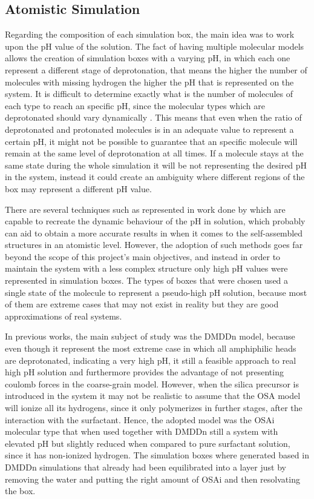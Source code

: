 \documentclass[10pt,a4paper,twoside]{article}
\begin{document}
\subsection{Atomistic Simulation}

Regarding the composition of each simulation box, the main idea was to work upon the pH value of the solution. The fact of having multiple molecular models allows the creation of simulation boxes with a varying pH, in which each one represent a different stage of deprotonation, that means the higher the number of molecules with missing hydrogen the higher the pH that is represented on the system. It is difficult to determine exactly what is the number of molecules of each type to reach an specific pH, since the molecular types which are deprotonated should vary dynamically \cite{phsol}. This means that even when the ratio of deprotonated and protonated molecules is in an adequate value to represent a certain pH, it might not be possible to guarantee that an specific molecule will remain at the same level of deprotonation  at all times. If a molecule stays at the same state during the whole simulation it will be not representing the desired pH in the system, instead it could create an ambiguity where different regions of the box may represent a different pH value.

 There are several techniques such as represented in work done by \cite{dynph} which are capable to recreate the dynamic behaviour of the pH in solution, which probably can aid to obtain a more accurate results in when it comes to the self-assembled structures in an atomistic level. However, the adoption of such methods goes far beyond the scope of this project's main objectives, and instead in order to maintain the system with a less complex structure only high pH values were represented in simulation boxes. The types of boxes that were chosen used a single state of the molecule to represent a pseudo-high pH solution, because most of them are extreme cases that may not exist in reality but they are good approximations of real systems.

 In previous works, the main subject of study was the DMDDn model, because even though it represent the most extreme case in which all amphiphilic heads are deprotonated, indicating a very high pH, it still a feasible approach to real high pH solution and furthermore provides the advantage of not presenting coulomb forces in the coarse-grain model. However, when the silica precursor is introduced in the system it may not be realistic to assume that the OSA model will ionize all its hydrogens, since it only polymerizes in further stages, after the interaction with the surfactant. Hence, the adopted model was the OSAi molecular type that when used together with DMDDn still a system with elevated pH but slightly reduced when compared to pure surfactant solution, since it has non-ionized hydrogen. The simulation boxes where generated based in DMDDn simulations that already had been equilibrated into a layer just by removing the water and putting the right amount of OSAi and then resolvating the box. 
 
\end{document}
